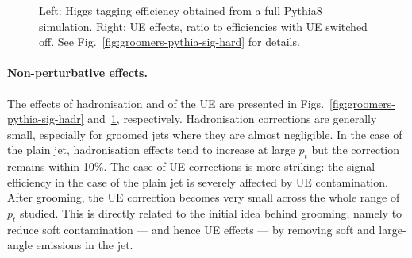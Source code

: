 \begin{figure}
  \hfill%
  \caption{Left: Higgs tagging efficiency obtained from a full
    Pythia8 simulation. Right: UE effects, \ie ratio to
    efficiencies with UE switched off. See
    Fig.~\ref{fig:groomers-pythia-sig-hard} for
    details.}\label{fig:groomers-pythia-sig-ue}
\end{figure}

\paragraph{Non-perturbative effects.} The effects of hadronisation and
of the UE are presented in
Figs.~\ref{fig:groomers-pythia-sig-hadr}
and~\ref{fig:groomers-pythia-sig-ue}, respectively.
%
Hadronisation corrections are generally small, especially for groomed
jets where they are almost negligible. In the case of the plain jet,
hadronisation effects tend to increase at large $p_t$ but the
correction remains within 10\%.
%
The case of UE corrections is more striking: the signal
efficiency in the case of the plain jet is severely affected by
UE contamination.
%
After grooming, the UE correction becomes very small
across the whole range of $p_t$ studied. This is directly related to
the initial idea behind grooming, namely to reduce soft contamination
--- and hence UE effects --- by removing soft and
large-angle emissions in the jet.

